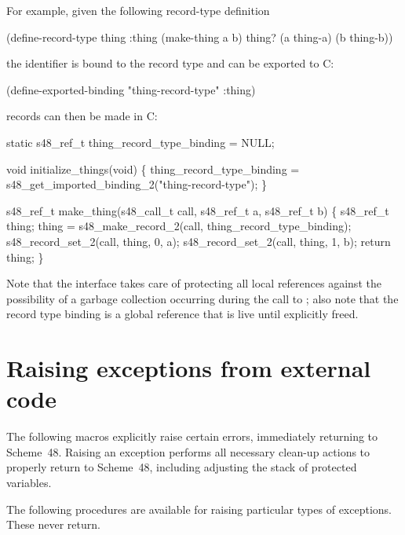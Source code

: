 For example, given the following record-type definition
\begin{example}
(define-record-type thing :thing
  (make-thing a b)
  thing?
  (a thing-a)
  (b thing-b))
\end{example}
 the identifier  is bound to the record type and can
 be exported to C:
\begin{example}
(define-exported-binding "thing-record-type" :thing)
\end{example}
 records can then be made in C:
\begin{example}
static s48_ref_t
  thing_record_type_binding = NULL;

void initialize_things(void)
\{
  thing_record_type_binding =
     s48_get_imported_binding_2("thing-record-type");
\}

s48_ref_t make_thing(s48_call_t call, s48_ref_t a, s48_ref_t b)
\{
  s48_ref_t thing;
  thing = s48_make_record_2(call, thing_record_type_binding);
  s48_record_set_2(call, thing, 0, a);
  s48_record_set_2(call, thing, 1, b);
  return thing;
\}
\end{example}
Note that the interface takes care of protecting all local references 
 against the possibility of a garbage collection occurring during
 the call to ; also note that the record
 type binding is a global reference that is live until explicitly
 freed.

\section{Raising exceptions from external code}
\label{sec:exceptions}

The following macros explicitly raise certain errors, immediately
 returning to Scheme~48.
Raising an exception performs all
 necessary clean-up actions to properly return to Scheme~48, including
 adjusting the stack of protected variables.

The following procedures are available for raising particular
 types of exceptions.
These never return.

\begin{protos}
\end{protos}

